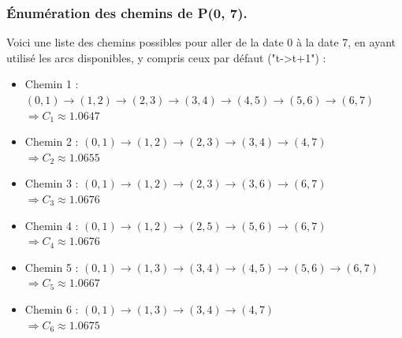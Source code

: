 \documentclass[a4paper,11pt]{article}
\begin{document}
\subsubsection{Énumération des chemins de P(0, 7).}
Voici une liste des chemins possibles pour aller de la date 0 à la date 7, en ayant utilisé les arcs disponibles, y compris ceux par défaut ("t->t+1") :


\begin{itemize}
	\item Chemin 1 : $(0,1) \to (1,2) \to (2,3) \to (3,4) \to (4,5) \to (5,6) \to (6,7)$ \\
	      \hspace{0.5cm} $\Rightarrow C_1 \approx 1.0647$
	      \vspace{0.3cm}
	      
	\item Chemin 2 : $(0,1) \to (1,2) \to (2,3) \to (3,4) \to (4,7)$ \\
	      \hspace{0.5cm} $\Rightarrow C_2 \approx 1.0655$
	      \vspace{0.3cm}
	      
	\item Chemin 3 : $(0,1) \to (1,2) \to (2,3) \to (3,6) \to (6,7)$ \\
	      \hspace{0.5cm} $\Rightarrow C_3 \approx 1.0676$
	      \vspace{0.3cm}
	      
	\item Chemin 4 : $(0,1) \to (1,2) \to (2,5) \to (5,6) \to (6,7)$ \\
	      \hspace{0.5cm} $\Rightarrow C_4 \approx 1.0676$
	      \vspace{0.3cm}
	      
	\item Chemin 5 : $(0,1) \to (1,3) \to (3,4) \to (4,5) \to (5,6) \to (6,7)$ \\
	      \hspace{0.5cm} $\Rightarrow C_5 \approx 1.0667$
	      \vspace{0.3cm}
	      
	\item Chemin 6 : $(0,1) \to (1,3) \to (3,4) \to (4,7)$ \\
	      \hspace{0.5cm} $\Rightarrow C_6 \approx 1.0675$
	      \vspace{0.3cm}
	      

\end{itemize}
\end{document}

